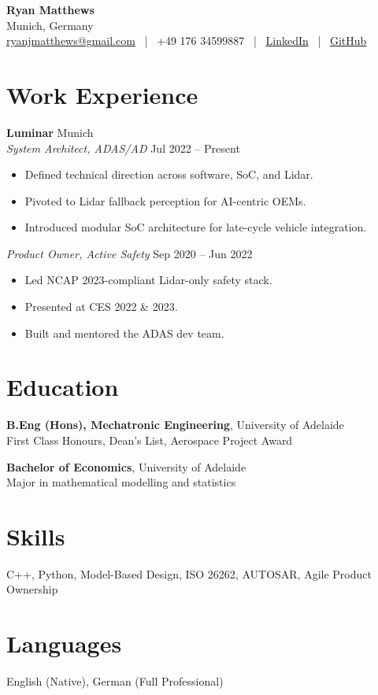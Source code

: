 \documentclass[10pt, letterpaper]{article}
\begin{document}
\begin{center}
    {\Huge \textbf{Ryan Matthews}}\\[0.2cm]
    Munich, Germany \\
    \href{mailto:ryanjmatthews@gmail.com}{ryanjmatthews@gmail.com} ~|~ 
    +49 176 34599887 ~|~ 
    \href{https://linkedin.com/in/yourlinkedin}{LinkedIn} ~|~ 
    \href{https://github.com/ryanmatthews}{GitHub}
\end{center}

\vspace{0.5cm}

\section*{Work Experience}

\textbf{Luminar} \hfill Munich \\
\textit{System Architect, ADAS/AD} \hfill Jul 2022 -- Present
\begin{itemize}[leftmargin=1.5em]
    \item Defined technical direction across software, SoC, and Lidar.
    \item Pivoted to Lidar fallback perception for AI-centric OEMs.
    \item Introduced modular SoC architecture for late-cycle vehicle integration.
\end{itemize}

\textit{Product Owner, Active Safety} \hfill Sep 2020 -- Jun 2022
\begin{itemize}[leftmargin=1.5em]
    \item Led NCAP 2023-compliant Lidar-only safety stack.
    \item Presented at CES 2022 \& 2023.
    \item Built and mentored the ADAS dev team.
\end{itemize}

\vspace{0.3cm}

\section*{Education}
\textbf{B.Eng (Hons), Mechatronic Engineering}, University of Adelaide\\
First Class Honours, Dean's List, Aerospace Project Award

\textbf{Bachelor of Economics}, University of Adelaide\\
Major in mathematical modelling and statistics

\vspace{0.3cm}

\section*{Skills}
C++, Python, Model-Based Design, ISO 26262, AUTOSAR, Agile Product Ownership

\vspace{0.3cm}

\section*{Languages}
English (Native), German (Full Professional)
\end{document}
